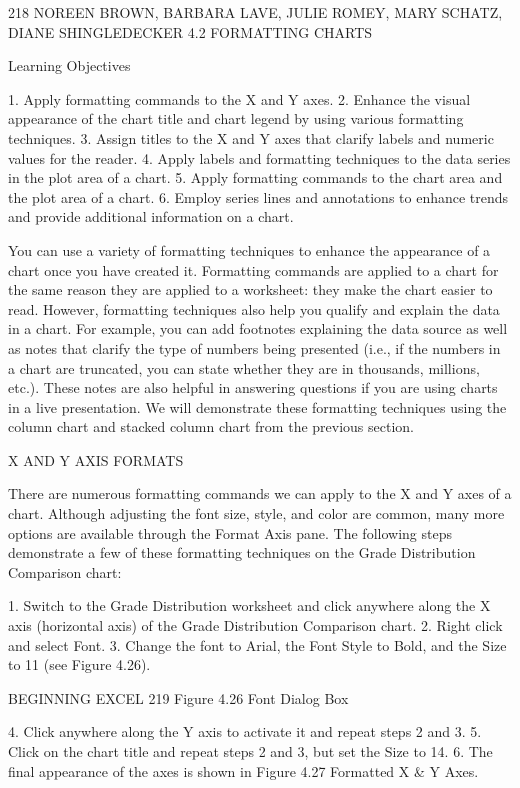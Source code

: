 218 NOREEN BROWN, BARBARA LAVE, JULIE ROMEY, MARY SCHATZ, DIANE SHINGLEDECKER
4.2 FORMATTING CHARTS




Learning Objectives


1. Apply formatting commands to the X and Y axes.
2. Enhance the visual appearance of the chart title and chart legend by using various formatting techniques.
3. Assign titles to the X and Y axes that clarify labels and numeric values for the reader.
4. Apply labels and formatting techniques to the data series in the plot area of a chart.
5. Apply formatting commands to the chart area and the plot area of a chart.
6. Employ series lines and annotations to enhance trends and provide additional information on a chart.



You can use a variety of formatting techniques to enhance the appearance of a chart once you have
created it. Formatting commands are applied to a chart for the same reason they are applied to a
worksheet: they make the chart easier to read. However, formatting techniques also help you qualify
and explain the data in a chart. For example, you can add footnotes explaining the data source as
well as notes that clarify the type of numbers being presented (i.e., if the numbers in a chart are
truncated, you can state whether they are in thousands, millions, etc.). These notes are also helpful
in answering questions if you are using charts in a live presentation. We will demonstrate these
formatting techniques using the column chart and stacked column chart from the previous section.

X AND Y AXIS FORMATS

There are numerous formatting commands we can apply to the X and Y axes of a chart. Although
adjusting the font size, style, and color are common, many more options are available through the
Format Axis pane. The following steps demonstrate a few of these formatting techniques on the
Grade Distribution Comparison chart:

1. Switch to the Grade Distribution worksheet and click anywhere along the X axis (horizontal
axis) of the Grade Distribution Comparison chart.
2. Right click and select Font.
3. Change the font to Arial, the Font Style to Bold, and the Size to 11 (see Figure 4.26).




BEGINNING EXCEL 219
Figure 4.26 Font Dialog Box


4. Click anywhere along the Y axis to activate it and repeat steps 2 and 3.
5. Click on the chart title and repeat steps 2 and 3, but set the Size to 14.
6. The final appearance of the axes is shown in Figure 4.27 Formatted X & Y Axes.




